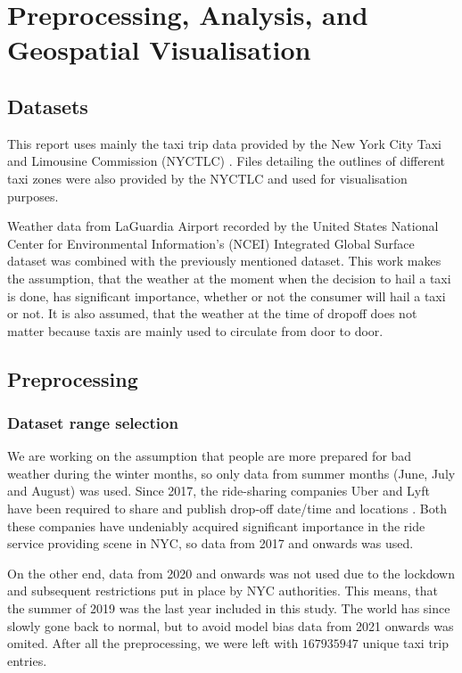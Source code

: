 \documentclass[11pt]{article}
\begin{document}
\section{Preprocessing, Analysis, and Geospatial Visualisation}

\subsection{Datasets}
This report uses mainly the taxi trip data provided by the New York City Taxi and Limousine Commission (NYCTLC) \cite{nyctlcData}. Files detailing the outlines of different taxi zones were also provided by the NYCTLC and used for visualisation purposes.

Weather data from LaGuardia Airport recorded by the United States National Center for Environmental Information's (NCEI) Integrated Global Surface dataset \cite{weatherData} was combined with the previously mentioned dataset. This work makes the assumption, that the weather at the moment when the decision to hail a taxi is done, has significant importance, whether or not the consumer will hail a taxi or not. It is also assumed, that the weather at the time of dropoff does not matter because taxis are mainly used to circulate from door to door.

\subsection{Preprocessing}

\subsubsection{Dataset range selection}

We are working on the assumption that people are more prepared for bad weather during the winter months, so only data from summer months (June, July and August) was used. Since 2017, the ride-sharing companies Uber and Lyft have been required to share and publish drop-off date/time and locations \cite{tripUserGuide}. Both these companies have undeniably acquired significant importance in the ride service providing scene in NYC, so data from 2017 and onwards was used. 

On the other end, data from 2020 and onwards was not used due to the lockdown and subsequent restrictions put in place by NYC authorities. This means, that the summer of 2019 was the last year included in this study. The world has since slowly gone back to normal, but to avoid model bias data from 2021 onwards was omited. After all the preprocessing, we were left with $167935947$ unique taxi trip entries.
\end{document}
